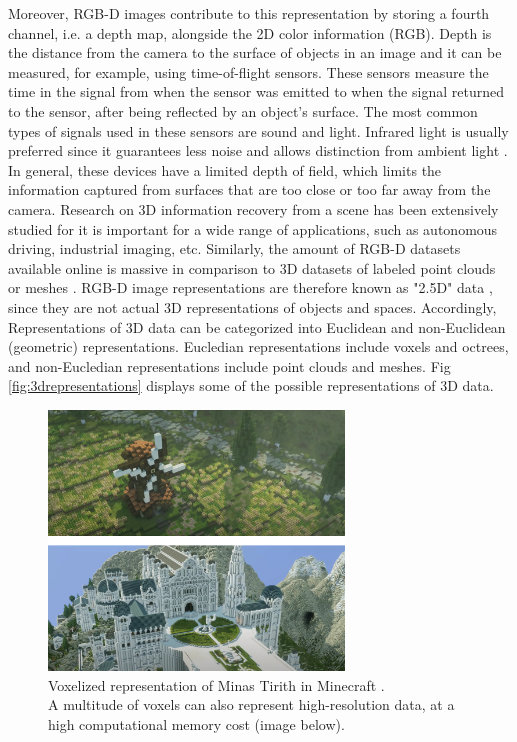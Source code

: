 Moreover, RGB-D images contribute to this representation by storing a fourth channel, i.e. a depth map, alongside the 2D color information (RGB). Depth is the distance from the camera to the surface of objects in an image and it can be measured, for example, using time-of-flight sensors. These sensors measure the time in the signal from when the sensor was emitted to when the signal returned to the sensor, after being reflected by an object's surface. The most common types of signals used in these sensors are sound and light. Infrared light is usually preferred since it guarantees less noise and allows distinction from ambient light \cite{terabee2021tofprinciple}. In general, these devices have a limited depth of field, which limits the information captured from surfaces that are too close or too far away from the camera. Research on 3D information recovery from a scene has been extensively studied \cite{fahim2021single} for it is important for a wide range of applications, such as autonomous driving, industrial imaging, etc. Similarly, the amount of RGB-D datasets available online is massive in comparison to 3D datasets of labeled point clouds or meshes \cite{firman2016rgbd}. RGB-D image representations are therefore known as "2.5D" data \cite{ahmed2018survey}, since they are not actual 3D representations of objects and spaces. Accordingly, Representations of 3D data can be categorized into Euclidean and non-Euclidean (geometric) representations. Eucledian representations include voxels and octrees, and non-Eucledian representations include point clouds and meshes. Fig \ref{fig:3drepresentations} displays some of the possible representations of 3D data. 


\begin{figure}[!ht]
        \centering
        \includegraphics[width=0.7\textwidth]{images/minecraft.png}
        \caption{Voxelized representation of Minas Tirith in Minecraft \cite{minecraft2020minastirith}.\\A multitude of voxels can also represent high-resolution data, at a high computational memory cost (image below).
        }
        \label{fig:minecraft}
\end{figure}


